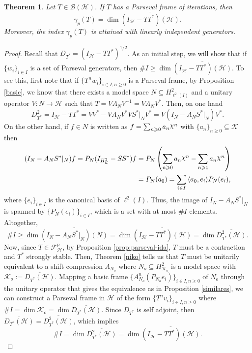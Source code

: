 \documentclass[a4paper,12pt]{amsart}
\def\cB{{\mathcal{B}}}
\def\cF{{\mathcal{F}}}
\def\HH{{\mathcal{H}}}
\def\KK{{\mathcal{K}}}
\def\cF{{\mathcal{F}}}
\DeclareRobustCommand{\rchi}{{\mathpalette\irchi\relax}}
\newcommand{\irchi}[2]{\raisebox{\depth}{$#1\chi$}} %
\newcommand{\scal}[1]{{\langle{#1}\rangle}}
\newtheorem{theorem}{Theorem}[section]
\theoremstyle{definition}
\begin{document}
\begin{theorem}\label{nikc2}
Let $T\in\cB(\HH)$. If $T$ has a Parseval frame of iterations, then
\begin{equation*}
\gamma_p(T)=\dim\overline{(I_\HH-TT^*)(\HH)}.
\end{equation*}
Moreover, the index $\gamma_p(T)$ is attained with linearly independent generators.

\end{theorem}
\begin{proof}
Recall that  $D_{T^*}=(I_{\HH}-TT^*)^{1/2}$.
As an initial step, we will show that if $\{w_i\}_{i\in I}$ is a set of Parseval generators, then $\#I\geqslant\dim\overline{(I_\HH-TT^*)(\HH)}$. To see this, first note  that if $\{T^nw_i\}_{i\in I,n\geqslant0}$ is a Parseval frame, by Proposition \ref{basic}, we know that there exists a model space $N\subseteq H^2_{\ell^2(I)}$ and a unitary operator $V:N\to\HH$ such that $T=VA_NV^{-1}=VA_NV^*$. Then, on one hand
\begin{equation*}
D_{T^*}^2=I_\HH-TT^*=VV^*-VA_NV^*VS^*|_NV^*=V(I_N-A_NS^*|_N)V^*.
\end{equation*}
On the other hand, if $f\in N$ is written as $f=\sum_{n\geqslant0}a_n\rchi^n$ with $\{a_n\}_{n\geqslant0}\subseteq\KK$ then
\begin{align*}
(I_N-A_NS^*|_N)f=P_N(I_{H^2_{\KK}}-SS^*)f&=P_N\left(\sum_{n\geqslant0}a_n\rchi^n-\sum_{n\geqslant1}a_n\rchi^n\right)
\\
&=P_N(a_0)=\sum_{i\in I}\scal{a_0,e_i}P_N(e_i),
\end{align*}
where $\{e_i\}_{i\in I}$ is the canonical basis of $\ell^2(I)$. Thus, the image of $I_N-A_NS^*|_N$ is spanned by $\{P_N(e_i)\}_{i\in I}$, which is a set with at most $\#I$ elements. Altogether,
\begin{equation*}
\#I\geqslant\dim\overline{(I_N-A_NS^*|_{N})(N)}=\dim\overline{(I_\HH-TT^*)(\HH)}=\dim\overline{D_{T^*}^2(\HH)}. 
\end{equation*}
Now, since $T\in\cF^{p}_{\HH}$, by Proposition \ref{prop:parseval-ida}, $T$ must be a contraction and $T^*$ strongly stable. Then, Theorem \ref{niko} tells us that $T$ must be unitarily equivalent to a shift compression $A_{N_o}$ where $N_o\subseteq H^2_{\KK_o}$ is a model space with $\KK_o:=\overline{D_{T^*}(\HH)}$. Mapping a basic frame $\{A_{N_o}^n(P_{N_o}e_i)\}_{i\in I,n\geqslant0}$ of $N_o$ through the unitary operator that gives the equivalence as in Proposition \ref{similares}, we can construct a Parseval frame in $\HH$ of the form $\{T^nv_i\}_{i\in I,n\geqslant0}$ where $\#I=\dim\KK_o=\dim\overline{D_{T^*}(\HH)}$. Since $D_{T^*}$ is self adjoint, then $\overline{D_{T^*}(\HH)}=\overline{D_{T^*}^2(\HH)}$, which implies
\begin{equation*}
\#I=\dim \overline{D_{T^*}^2(\HH)}=\dim\overline{(I_\HH-TT^*)(\HH)}.
\end{equation*}


\end{proof}
\end{document}
